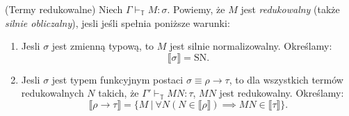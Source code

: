 \begin{definicja}(Termy redukowalne)
  Niech \(\Gamma\vdash_\mathbb{T} M:\sigma\). Powiemy, że \(M\) jest \emph{redukowalny} (także \emph{silnie obliczalny}), jesli jeśli spełnia poniższe warunki:
  \begin{enumerate}[label=(R\arabic*), ref=(R\arabic*)]
    \item Jesli \(\sigma\) jest zmienną typową, to \(M\) jest silnie normalizowalny. Określamy:
      \[
        \llbracket \sigma \rrbracket = \mathrm{SN}.
      \]
    \item Jesli \(\sigma\) jest typem funkcyjnym postaci \(\sigma\equiv \rho\to\tau\), to dla wszystkich termów redukowalnych \(N\) takich, że \(\Gamma'\vdash_\mathbb{T}MN:\tau\), \(MN\) jest redukowalny. Określamy:
      \[
        \llbracket \rho \to \tau\rrbracket = \{M\ |\ \forall N (N\in\llbracket \rho \rrbracket)\implies MN\in\llbracket \tau \rrbracket\}.
      \]

  \end{enumerate}
\end{definicja}

